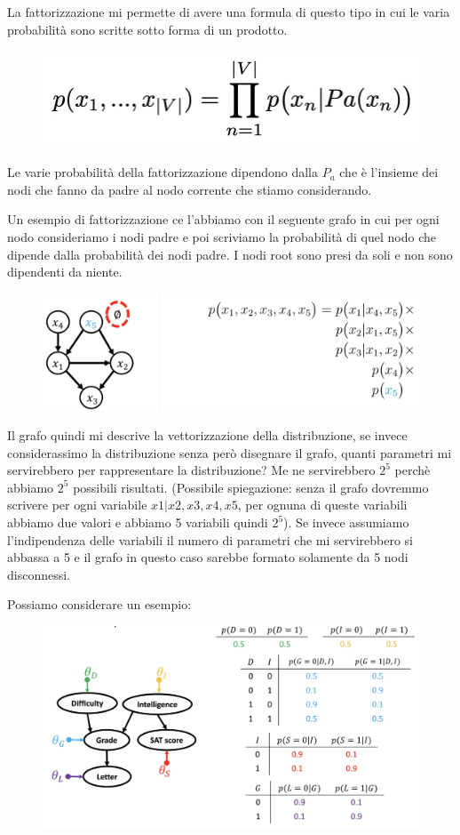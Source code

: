 \documentclass[14pt]{extreport}
\begin{document}
La fattorizzazione mi permette di avere una formula di questo tipo in cui le varia probabilità sono scritte sotto forma di un prodotto.

\begin{figure}[H]
\centering
\includegraphics[width=0.4\linewidth]{99.jpeg}
\end{figure}

Le varie probabilità della fattorizzazione dipendono dalla $P_a$ che è l'insieme dei nodi che fanno da padre al nodo corrente che stiamo considerando.

Un esempio di fattorizzazione ce l'abbiamo con il seguente grafo in cui per ogni nodo consideriamo i nodi padre e poi scriviamo la probabilità di quel
nodo che dipende dalla probabilità dei nodi padre. I nodi root sono presi da soli e non sono dipendenti da niente.

\begin{figure}[H]
\centering
\includegraphics[width=0.7\linewidth]{101.jpeg}
\end{figure}

Il grafo quindi mi descrive la vettorizzazione della distribuzione, se invece considerassimo la distribuzione senza però disegnare il grafo, quanti
parametri mi servirebbero per rappresentare la distribuzione? Me ne servirebbero $2^5$ perchè abbiamo $2^5$ possibili risultati. (Possibile
spiegazione: senza il grafo dovremmo scrivere per ogni variabile $x1|x2,x3,x4,x5$, per ognuna di queste variabili abbiamo due valori e abbiamo 5
variabili quindi $2^5$). Se invece assumiamo l'indipendenza delle variabili il numero di parametri che mi servirebbero si abbassa a 5 e il grafo in
questo caso sarebbe formato solamente da 5 nodi disconnessi.

Possiamo considerare un esempio:

\begin{figure}[H]
\centering
\includegraphics[width=0.7\linewidth]{102.jpeg}
\end{figure}
\end{document}
